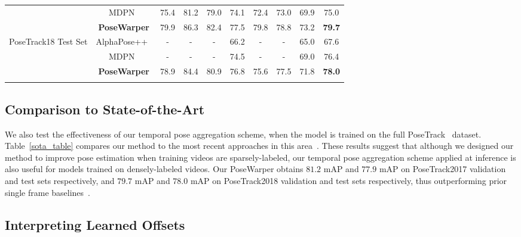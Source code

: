 \documentclass{article}
\begin{document}
\begin{table}[t]
\begin{center}
\begin{tabular}{c c c  c  c  c  c  c  c | c }
  & MDPN~\cite{DBLP:conf/eccv/GuoTLCLW18} & 75.4 & 81.2 & 79.0 & 74.1 & 72.4 & 73.0 & 69.9 & 75.0\\
  & \bf PoseWarper & 79.9 & 86.3 & 82.4 & 77.5 & 79.8 & 78.8 & 73.2 & \bf 79.7\\
  \hline
    \multirow{3}{*}{PoseTrack18 Test Set} & AlphaPose++~\cite{DBLP:conf/eccv/GuoTLCLW18, Fang_2017_ICCV} & - & - & - & 66.2 & - & - & 65.0 & 67.6\\
  & MDPN~\cite{DBLP:conf/eccv/GuoTLCLW18} & - & - & - & 74.5 & - & - & 69.0 & 76.4\\
  & \bf PoseWarper & 78.9 & 84.4 & 80.9 & 76.8 & 75.6 & 77.5 & 71.8 & \bf 78.0\\
 \hline
 \vspace{-0.5cm}
\end{tabular}
\end{center}
\end{table}


\subsection{Comparison to State-of-the-Art}



We also test the effectiveness of our temporal pose aggregation scheme, when the model is trained on the full PoseTrack~\cite{Iqbal_CVPR2017} dataset. Table~\ref{sota_table} compares our method to the most recent approaches in this area~\cite{girdhar2018detecttrack,xiu2018poseflow,xiao2018simple,sun2019deep}. These results suggest that although we designed our method to improve pose estimation when training videos are sparsely-labeled, our temporal pose aggregation scheme applied at inference is also useful for models trained on densely-labeled videos. Our PoseWarper obtains $81.2$ mAP and $77.9$ mAP on PoseTrack2017 validation and test sets respectively, and $79.7$ mAP and $78.0$ mAP on PoseTrack2018 validation and test sets respectively, thus outperforming prior single frame baselines~\cite{girdhar2018detecttrack,xiu2018poseflow,xiao2018simple,sun2019deep}.













\subsection{Interpreting Learned Offsets}
\end{document}

